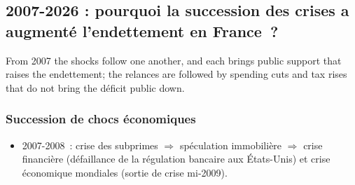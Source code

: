 \subsection{2007-2026 : pourquoi la succession des crises a augmenté l'endettement en France~?}

From 2007 the shocks follow one another, and each brings public support that raises
the endettement; the relances are followed by spending cuts and tax rises that do not
bring the déficit public down.

\subsubsection{Succession de chocs économiques}

\begin{itemize}
  \item 2007-2008~: crise des subprimes $\Rightarrow$ spéculation immobilière
    $\Rightarrow$ crise financière (défaillance de la régulation bancaire aux États-Unis)
    et crise économique mondiales (sortie de crise mi-2009).
\end{itemize}

